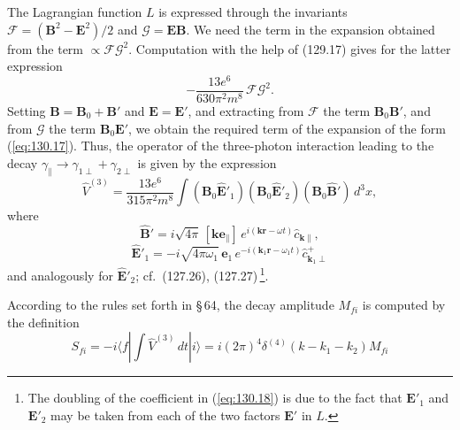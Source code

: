The Lagrangian function $L$ is expressed through the invariants $\mathcal{F} = (\mathbf{B}^2 - \mathbf{E}^2)/2$ and $\mathcal{G} = \mathbf{E}\mathbf{B}$. We need the term in the expansion obtained from the term $\propto\mathcal{F}\mathcal{G}^2$. Computation with the help of (129.17) gives for the latter expression
\[
-\frac{13e^6}{630\pi^2 m^8}\,\mathcal{F}\mathcal{G}^2.
\]
Setting $\mathbf{B} = \mathbf{B}_0 + \mathbf{B}'$ and $\mathbf{E} = \mathbf{E}'$, and extracting from $\mathcal{F}$ the term $\mathbf{B}_0\mathbf{B}'$, and from $\mathcal{G}$ the term $\mathbf{B}_0\mathbf{E}'$, we obtain the required term of the expansion of the form (\ref{eq:130.17}). Thus, the operator of the three-photon interaction leading to the decay $\gamma_\parallel \to \gamma_{1\perp} + \gamma_{2\perp}$ is given by the expression
\begin{equation}
\hat{V}^{(3)} = \frac{13e^6}{315\pi^2 m^8}\int(\mathbf{B}_0\hat{\mathbf{E}}'_1)(\mathbf{B}_0\hat{\mathbf{E}}'_2)(\mathbf{B}_0\hat{\mathbf{B}}')\,d^3x,
\label{eq:130.18}
\end{equation}
where
\[
\hat{\mathbf{B}}' = i\sqrt{4\pi}\,[\mathbf{k}\mathbf{e}_\parallel]\,e^{i(\mathbf{k}\mathbf{r} - \omega t)}\hat{c}_{\mathbf{k}\parallel},
\]
\[
\hat{\mathbf{E}}'_1 = -i\sqrt{4\pi\omega_1}\,\mathbf{e}_1\,e^{-i(\mathbf{k}_1\mathbf{r} - \omega_1 t)}\hat{c}^+_{\mathbf{k}_1\perp}
\]
and analogously for $\hat{\mathbf{E}}'_2$; cf.\ (127.26), (127.27)\,\footnote{The doubling of the coefficient in (\ref{eq:130.18}) is due to the fact that $\mathbf{E}'_1$ and $\mathbf{E}'_2$ may be taken from each of the two factors $\mathbf{E}'$ in $L$.}.

According to the rules set forth in \S\,64, the decay amplitude $M_{fi}$ is computed by the definition
\[
S_{fi} = -i\langle f|\!\int\hat{V}^{(3)}\,dt|i\rangle = i(2\pi)^4\delta^{(4)}(k - k_1 - k_2)M_{fi}
\]



